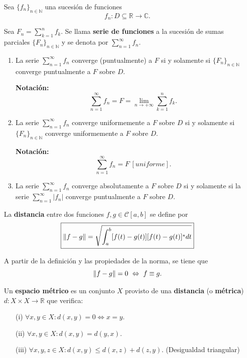 \begin{defi}
Sea $\{f_n\}_{n \in \mathbb{N}}$ una sucesión de funciones
$$f_n: D \subseteq \mathbb{R} \longrightarrow \mathbb{C}.$$

Sea $F_n = \sum\limits_{k=1}^n f_k$. Se llama \textbf{serie de funciones} a la sucesión de sumas parciales $\{F_n\}_{n\in\mathbb{N}}$ y se denota por $\sum\limits_{n=1}^{\infty} f_n$.

\begin{enumerate}
    \item La serie $\sum\limits_{n=1}^{\infty} f_n$ converge (puntualmente) a $F$ si y solamente si $\{F_n\}_{n \in \mathbb{N}}$ converge puntualmente a $F$ sobre $D$.
    
    \textbf{Notación:} 
    $$\sum_{n=1}^{\infty} f_n = F = \lim_{n\to + \infty} \sum_{k=1}^n f_k.$$
    
    \item La serie $\sum\limits_{n=1}^{\infty} f_n$ converge uniformemente a $F$  sobre $D$ si y solamente si $\{F_n\}_{n \in \mathbb{N}}$ converge uniformemente a $F$ sobre $D$.
    
    \textbf{Notación:} 
    $$\sum_{n=1}^{\infty} f_n = F ~[uniforme].$$
    
    \item La serie $\sum\limits_{n=1}^{\infty} f_n$ converge absolutamente a $F$  sobre $D$ si y solamente si la serie $\sum\limits_{n=1}^{\infty} |f_n|$ converge puntualmente a $F$ sobre $D$.
    
\end{enumerate}
\end{defi}

\begin{defi}
La \textbf{distancia} entre dos funciones $f,g \in \mathcal{C}[a,b]$ se define por 
$$\boxed{\lVert f-g\rVert = \sqrt{\int_a^b [f(t)-g(t)][f(t)-g(t)]^* dt}}$$
\end{defi}

A partir de la definición y las propiedades de la norma, se tiene que
$$\lVert f-g\rVert = 0 ~\Leftrightarrow~ f \equiv g.$$

\begin{defi}
Un \textbf{espacio métrico} es un conjunto $X$ provisto de una \textbf{distancia} (o \textbf{métrica}) $d: X \times X \rightarrow \mathbb{R}$ que verifica:

\begin{enumerate}
    \item[(i)] $\forall x,y \in X: d(x,y) = 0 \Leftrightarrow x = y$.
    
    \item[(ii)] $\forall x,y \in X: d(x,y) = d(y,x)$.
    
    \item[(iii)] $\forall x,y,z \in X: d(x,y) \leq d(x,z) + d(z,y)$. (Desigualdad triangular)
\end{enumerate}
\end{defi}

